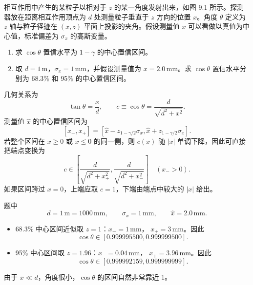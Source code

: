 \begin{question}
相互作用中产生的某粒子以相对于 \(z\) 的某一角度发射出来，如图 9.1
所示。探测器放在距离相互作用顶点为 \(d\) 处测量粒子垂直于 \(z\)
方向的位置 \(x\)。角度 \(\theta\) 定义为 \(z\) 轴与粒子径迹在 \((x,z)\)
平面上投影的夹角。假设测量值 \(x\) 可以看做以真值为中心值，标准偏差为
\(\sigma_x\) 的高斯变量。


\begin{enumerate}
\item
  求 \(\cos\theta\) 置信水平为 \(1-\gamma\) 的中心置信区间。
\item
  取 \(d=1\,\mathrm{m}\)，\(\sigma_x=1\,\mathrm{mm}\)，并假设测量值为
  \(x=2.0\,\mathrm{mm}\)。求 \(\cos\theta\) 置信水平分别为 68.3\% 和
  95\% 的中心置信区间。
\end{enumerate}
\begin{solution}
几何关系为
\[
\tan\theta=\frac{x}{d},
\qquad
c\equiv\cos\theta=\frac{d}{\sqrt{d^2+x^2}}.
\]
测量值 \(\hat x\) 的中心置信区间为
\[
[x_-,x_+]=[\hat x-z_{1-\gamma/2}\sigma_x,
\hat x+z_{1-\gamma/2}\sigma_x].
\]
若整个区间在 \(x\ge0\) 或 \(x\le0\) 的同一侧，则 \(c(x)\) 随 \(|x|\)
单调下降，因此可直接把端点变换为
\[
c\in
\left[
\frac{d}{\sqrt{d^2+x_+^2}},
\frac{d}{\sqrt{d^2+x_-^2}}
\right]
\quad(x_->0).
\]
如果区间跨过 \(x=0\)，上端应取 \(c=1\)，下端由端点中较大的 \(|x|\) 给出。

题中
\[
d=1\,\mathrm m=1000\,\mathrm{mm},
\qquad
\sigma_x=1\,\mathrm{mm},
\qquad
\hat x=2.0\,\mathrm{mm}.
\]

\begin{itemize}
\item 68.3\% 中心区间近似取 \(z=1\)：\(x_-=1\,\mathrm{mm}\)，
\(x_+=3\,\mathrm{mm}\)。因此
\[
\cos\theta\in
[0.999995500,
0.999999500].
\]

\item 95\% 中心区间取 \(z=1.96\)：\(x_-=0.04\,\mathrm{mm}\)，
\(x_+=3.96\,\mathrm{mm}\)。因此
\[
\cos\theta\in
[0.999992159,
0.999999999].
\]
\end{itemize}
由于 \(x\ll d\)，角度很小，\(\cos\theta\) 的区间自然非常靠近 1。
\end{solution}
\end{question}

